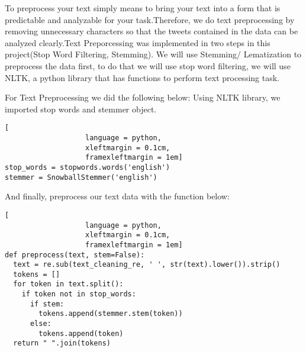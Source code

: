 To preprocess your text simply means to bring your text into a form that is predictable and analyzable for your task.Therefore, we do text preprocessing by removing unnecessary characters so that the tweets contained in the data can be analyzed clearly.Text Preporcessing was implemented in two steps in this project(Stop Word Filtering, Stemming). We will use Stemming/ Lematization to preprocess the data first, to do that we will use stop word filtering, we will use NLTK, a python library that has functions to perform text processing task.

For Text Preprocessing we did the following below:
Using NLTK library, we imported stop words and stemmer object.
\begin{lstlisting}[
                   language = python,
                   xleftmargin = 0.1cm,
                   framexleftmargin = 1em]
stop_words = stopwords.words('english') 
stemmer = SnowballStemmer('english') 
\end{lstlisting}
And finally, preprocess our text data with the function below:
\begin{lstlisting}[
                   language = python,
                   xleftmargin = 0.1cm,
                   framexleftmargin = 1em]
def preprocess(text, stem=False):
  text = re.sub(text_cleaning_re, ' ', str(text).lower()).strip()   
  tokens = []
  for token in text.split():
    if token not in stop_words:   
      if stem:
        tokens.append(stemmer.stem(token))
      else:
        tokens.append(token)
  return " ".join(tokens)
\end{lstlisting}
